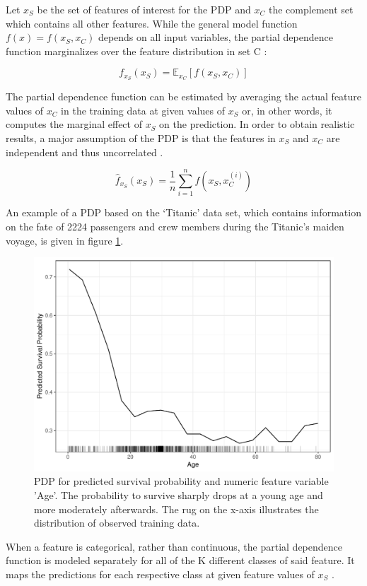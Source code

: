 \documentclass[]{krantz}
\begin{document}
Let \(x_S\) be the set of features of interest for the PDP and \(x_C\)
the complement set which contains all other features. While the general
model function \(f(x) = f(x_S, x_C)\) depends on all input variables,
the partial dependence function marginalizes over the feature
distribution in set C \citep{hastie2013elements}:

\[f_{x_S}(x_S) = \mathbb{E}_{x_C}[f(x_S, x_C)]\]

The partial dependence function can be estimated by averaging the actual
feature values of \(x_C\) in the training data at given values of
\(x_S\) or, in other words, it computes the marginal effect of \(x_S\)
on the prediction. In order to obtain realistic results, a major
assumption of the PDP is that the features in \(x_S\) and \(x_C\) are
independent and thus uncorrelated \citep{hastie2013elements}.

\[\hat{f}_{x_S}(x_S)=\frac{1}{n}\sum_{i=1}^{n}f(x_S, x^{(i)}_{C})\]

An example of a PDP based on the `Titanic' data set, which contains
information on the fate of 2224 passengers and crew members during the
Titanic's maiden voyage, is given in figure \ref{fig:plot1}.

\begin{figure}

{\centering \includegraphics[width=0.8\linewidth]{images/PDP_Plot_1} 

}

\caption{PDP for predicted survival probability and numeric feature variable 'Age'. The probability to survive sharply drops at a young age and more moderately afterwards. The rug on the x-axis illustrates the distribution of observed training data.}\label{fig:plot1}
\end{figure}

When a feature is categorical, rather than continuous, the partial
dependence function is modeled separately for all of the K different
classes of said feature. It maps the predictions for each respective
class at given feature values of \(x_S\) \citep{hastie2013elements}.
\end{document}
